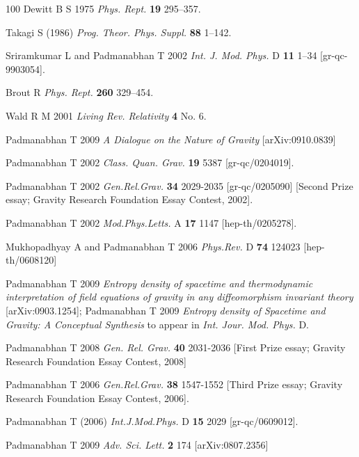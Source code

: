 \documentclass[12pt]{iopart}
\begin{document}
\begin{thebibliography}{100}
Dewitt B S 1975 \textit{Phys. Rept.} \textbf{19}  295--357.

Takagi S  (1986) \textit{Prog.  Theor. Phys. Suppl.} \textbf{88}  1--142.

Sriramkumar L and  Padmanabhan T 2002 \textit{Int. J. Mod. Phys.} D \textbf{11}  1--34 [gr-qc-9903054].


Brout R  \textit{Phys. Rept.} \textbf{260}  329--454.

Wald R M  2001 \textit{Living Rev. Relativity } \textbf{4}  No. 6.
 
Padmanabhan T 2009 \textit{A Dialogue on the Nature of Gravity} [arXiv:0910.0839] 

 Padmanabhan T 2002 {\it Class. Quan. Grav.} {\bf 19} 5387  [gr-qc/0204019].

 Padmanabhan T 2002 \textit{Gen.Rel.Grav.}  \textbf{34}  2029-2035  [gr-qc/0205090]  [Second Prize essay; Gravity Research Foundation Essay Contest, 2002]. 
 
 Padmanabhan T 2002 \textit{Mod.Phys.Letts.} A  \textbf{17} 1147  [hep-th/0205278]. 
 
  Mukhopadhyay A and Padmanabhan T 2006 \textit{Phys.Rev.} D \textbf{74} 124023 [hep-th/0608120] 
 
Padmanabhan T 2009 
     \textit{Entropy density of spacetime and thermodynamic interpretation of field equations of gravity in any diffeomorphism invariant theory} [arXiv:0903.1254];
Padmanabhan T 2009 
      \textit{Entropy density of Spacetime and Gravity: A Conceptual Synthesis} to appear in \textit{Int. Jour. Mod. Phys.} D.


 Padmanabhan T  2008   \textit{Gen. Rel. Grav.}  \textbf{40}  2031-2036   [First Prize essay; Gravity Research Foundation Essay Contest, 2008]

 Padmanabhan T 2006 \textit{Gen.Rel.Grav.}  \textbf{38} 1547-1552  [Third Prize essay; Gravity Research Foundation Essay Contest, 2006].

 Padmanabhan T (2006) \textit{Int.J.Mod.Phys.} D \textbf{15}  2029  [gr-qc/0609012]. 
 
 Padmanabhan T 2009 \textit{Adv. Sci. Lett.}  \textbf{2}  174  [arXiv:0807.2356] 


\end{thebibliography}
\end{document}
